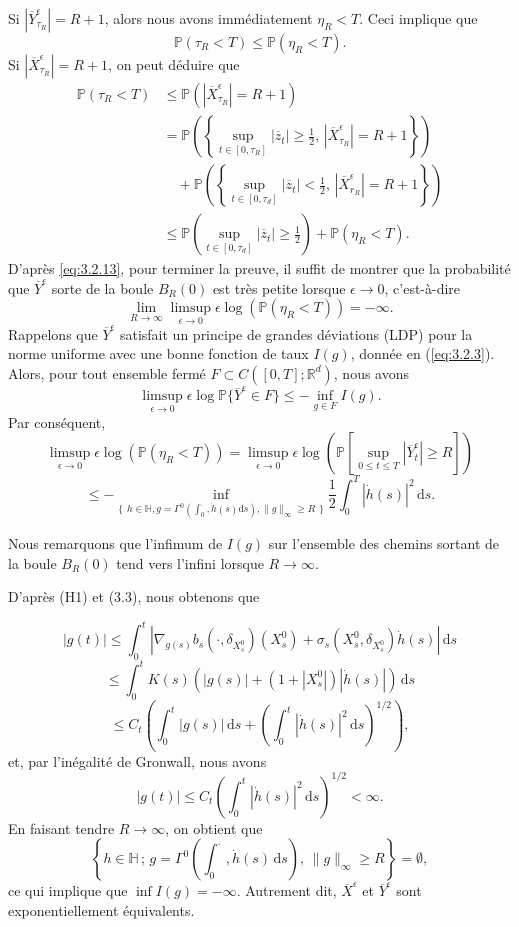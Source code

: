 \documentclass[12pt,a4paper,twoside]{report}%
\theoremstyle{definition}
\numberwithin{equation}{section}
\begin{document}
Si \(|\overline{Y}^\epsilon_{\tau_R}| = R+1\), alors nous avons immédiatement \(\eta_R < T\). Ceci implique que
\[
\mathbb{P}(\tau_R < T) \leq \mathbb{P}(\eta_R < T).
\]
Si \(|\overline{X}^\epsilon_{\tau_R}| = R+1\), on peut déduire que
\begin{align*}
	\mathbb{P}(\tau_R < T) 
	&\leq \mathbb{P}\left( |\overline{X}^\epsilon_{\tau_R}| = R+1 \right) \\
	&= \mathbb{P}\left( \left\{ \sup_{t \in [0, \tau_R]} |\overline{z}_t| \geq \frac{1}{2},\, |\overline{X}^\epsilon_{\tau_R}| = R+1 \right\} \right) \\
	&\quad + \mathbb{P}\left( \left\{ \sup_{t \in [0, \tau_d]} |\overline{z}_t| < \frac{1}{2},\, |\overline{X}^\epsilon_{r_R}| = R+1 \right\} \right) \\
	&\leq \mathbb{P}\left( \sup_{t \in [0, \tau_d]} |\overline{z}_t| \geq \frac{1}{2} \right) + \mathbb{P}(\eta_R < T).
\end{align*}
D'après \eqref{eq:3.2.13}, pour terminer la preuve, il suffit de montrer que la probabilité que \(\overline{Y}^\epsilon\) sorte de la boule \(B_R(0)\) est très petite lorsque \(\epsilon \to 0\), c’est-à-dire
\[
\lim_{R \to \infty} \limsup_{\epsilon \to 0} \epsilon \log \left( \mathbb{P}(\eta_R < T) \right) = -\infty.
\]
Rappelons que \(\overline{Y}^\epsilon\) satisfait un principe de grandes déviations (LDP) pour la norme uniforme avec une bonne fonction de taux \(I(g)\), donnée en (\ref{eq:3.2.3}). Alors, pour tout ensemble fermé \(F \subset C([0, T]; \mathbb{R}^d)\), nous avons
\[
\limsup_{\epsilon \to 0} \epsilon \log \mathbb{P}\{\overline{Y}^\epsilon \in F\} \leq - \inf_{g \in F} I(g).
\]
Par conséquent,
\[
\limsup_{\epsilon \to 0} \epsilon \log\left(\mathbb{P}(\eta_{R}<T)\right) 
= \limsup_{\epsilon \to 0} \epsilon \log\left(\mathbb{P}\left[\sup_{0 \leq t \leq T} |\overline{Y}_{t}^{\epsilon}| \geq R\right]\right)
\]
\[
\leq -\inf_{ \{\substack{h \in \mathbb{H}, g = \Gamma^{0}(\int_{0}^{\cdot}, \dot{h}(s)\mathrm{d}s), \|g\|_{\infty} \geq R}\}}
\frac{1}{2} \int_{0}^{T} |\dot{h}(s)|^{2} \, \mathrm{d}s.
\]

Nous remarquons que l'infimum de \( I(g) \) sur l'ensemble des chemins sortant de la boule \( B_{R}(0) \) tend vers l'infini lorsque \( R \to \infty \).

D'après (H1) et (3.3), nous obtenons que

\[
|g(t)| \leq \int_{0}^{t} 
\left| \nabla_{g(s)} b_{s}(\cdot, \delta_{X_{s}^{0}})(X_{s}^{0}) + \sigma_{s}(X_{s}^{0}, \delta_{X_{s}^{0}}) \dot{h}(s) \right| \, \mathrm{d}s
\]
\[
\leq \int_{0}^{t} K(s) \left( |g(s)| + (1 + |X_{s}^{0}|) |\dot{h}(s)| \right) \, \mathrm{d}s
\]
\[
\leq C_{t} \left( \int_{0}^{t} |g(s)| \, \mathrm{d}s + \left( \int_{0}^{t} |\dot{h}(s)|^{2} \, \mathrm{d}s \right)^{1/2} \right),
\]
et, par l'inégalité de Gronwall, nous avons
\[
|g(t)| \leq C_{t} \left( \int_{0}^{t} |\dot{h}(s)|^{2} \, \mathrm{d}s \right)^{1/2} < \infty.
\]	 	
En faisant tendre \( R \to \infty \), on obtient que
\[
\left\{ h \in \mathbb{H} \,;\, g = \Gamma^{0}(\int_{0}^{\cdot}, \dot{h}(s) \, \mathrm{d}s), \, \|g\|_{\infty} \geq R \right\} = \emptyset,
\]
ce qui implique que \( \inf I(g) = -\infty \). Autrement dit, \( \overline{X}^{\epsilon} \) et \( \overline{Y}^{\epsilon} \) sont exponentiellement équivalents.
\end{document}
